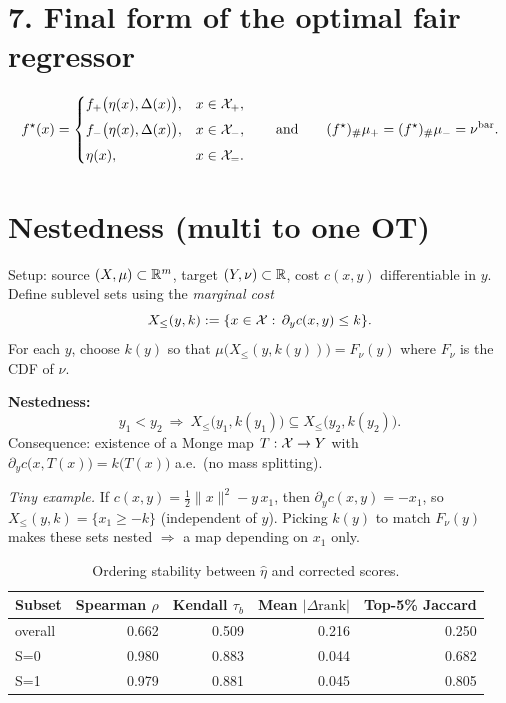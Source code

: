 \documentclass[11pt]{article}
\begin{document}
\section*{7. Final form of the optimal fair regressor}
\begin{equation}
  f^\star(x)=
\begin{cases}
f_+\big(\eta(x),\Delta(x)\big), & x\in\mathcal{X}_+,\\[4pt]
f_-\big(\eta(x),\Delta(x)\big), & x\in\mathcal{X}_-,\\[4pt]
\eta(x), & x\in\mathcal{X}_=.
\end{cases}
\qquad\text{and}\qquad
(f^\star)_{\#}\mu_+=(f^\star)_{\#}\mu_-=\nu^{\mathrm{bar}}.
\end{equation}


\section{ Nestedness (multi to one OT)}
Setup: source $(X,\mu)\subset\mathbb{R}^m$, target $(Y,\nu)\subset\mathbb{R}$, cost $c(x,y)$ differentiable in $y$.
Define sublevel sets using the \emph{marginal cost}
\begin{equation}
X_{\le}(y,k):=\{x\in\mathcal{X}:\,\partial_y c(x,y)\le k\}.
\end{equation}
For each $y$, choose $k(y)$ so that $\mu\big(X_{\le}(y,k(y))\big)=F_\nu(y)$ where $F_\nu$ is the CDF of $\nu$.

\textbf{Nestedness:}
\begin{equation}
y_1<y_2\ \Longrightarrow\ X_{\le}\!\big(y_1,k(y_1)\big)\subseteq X_{\le}\!\big(y_2,k(y_2)\big).
\end{equation}
Consequence: existence of a Monge map $T:\mathcal{X}\to Y$ with
$\partial_y c\big(x,T(x)\big)=k\big(T(x)\big)$ a.e.\ (no mass splitting).

\medskip
\emph{Tiny example.} If $c(x,y)=\tfrac12\|x\|^2-y\,x_1$, then $\partial_y c(x,y)=-x_1$, so $X_{\le}(y,k)=\{x_1\ge -k\}$ (independent of $y$). Picking $k(y)$ to match $F_\nu(y)$ makes these sets nested $\Rightarrow$ a map depending on $x_1$ only.


\begin{table}[t]
  \centering
  \begin{tabular}{lrrrr}
  \toprule
  Subset & Spearman $\rho$ & Kendall $\tau_b$ & Mean $|\Delta\mathrm{rank}|$ & Top-5\% Jaccard \\
  \midrule
  overall & 0.662 & 0.509 & 0.216 & 0.250 \\
  S=0 & 0.980 & 0.883 & 0.044 & 0.682 \\
  S=1 & 0.979 & 0.881 & 0.045 & 0.805 \\
  \bottomrule
  \end{tabular}
  \caption[Ordering stability between eta-hat and corrected scores.]{Ordering stability between $\hat\eta$ and corrected scores.}
  \label{tab:ordering}
\end{table}
\end{document}
